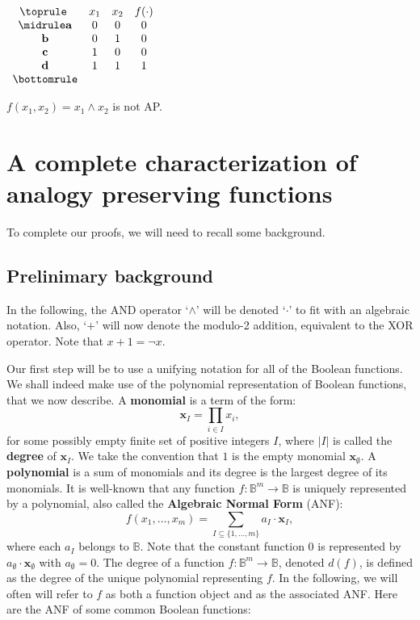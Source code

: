\begin{table}[ht]
  \center
$\begin{array}{cccc}
  \toprule
  ~ & x_1 & x_2 & f(\cdot) \\
  \midrule
  \mathbf{a} & 0 & 0 & 0\\
  \mathbf{b} & 0 & 1 & 0\\
  \mathbf{c} & 1 & 0 & 0\\
  \mathbf{d} & 1 & 1 & 1\\
  \bottomrule
\end{array}
$\bigskip
\caption{$f(x_1,x_2)= x_1 \wedge x_2$ is not AP.}
\label{exampleNotAP}
\end{table}

\section{A complete characterization of analogy preserving functions}

To complete our proofs, we will need to recall some background.

\subsection{Prelinimary background}

In the following, the AND operator `$\wedge$' will be denoted `$\cdot$' to fit
with an algebraic notation. Also, `$+$' will now denote the modulo-2 addition,
equivalent to the XOR operator. Note that $x + 1 = \neg x$.

Our first step will be to use a unifying notation for all of the Boolean
functions. We shall indeed make use of the  polynomial representation of
Boolean functions, that we now describe. A \textbf{ monomial} is a term of the
form:
$$
\mathbf{x}_I=\underset{i\in I}{\prod}x_i, $$ for some possibly empty finite set of
positive integers $I$, where $|I|$ is called the \textbf{degree} of
$\mathbf{x}_I$.   We take the convention that $1$ is the empty monomial
$\mathbf{x}_\emptyset $. A \textbf{ polynomial} is a sum of monomials and its
degree is the largest degree of its monomials.  It is well-known
\cite{StoneAlgebra36,ZhegalkinAlgebra27} that any function
$f:\mathbb{B}^m\rightarrow \mathbb{B}$ is uniquely represented by a polynomial,
also called the \textbf{Algebraic Normal Form} (ANF):
$$f(x_1,\ldots,x_m)=\sum_{I\subseteq \{1,\ldots,m\}}a_I\cdot \mathbf{x}_I,$$
where each $a_I$ belongs to $\mathbb{B}$. Note that the constant function $0$
is represented by $a_\emptyset\cdot \mathbf{x}_\emptyset$ with $a_\emptyset
=0$. The degree of a function $f:\mathbb{B}^m\rightarrow \mathbb{B}$, denoted
$d(f)$, is defined as the degree of the unique polynomial representing $f$. In
the following, we will often will refer to $f$ as both a function object and as
the associated ANF. Here are the ANF of some common Boolean functions:


